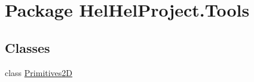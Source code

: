 \hypertarget{namespace_hel_hel_project_1_1_tools}{}\section{Package Hel\+Hel\+Project.\+Tools}
\label{namespace_hel_hel_project_1_1_tools}
\subsection*{Classes}
\begin{DoxyCompactItemize}
\item 
class \hyperlink{class_hel_hel_project_1_1_tools_1_1_primitives2_d}{Primitives2\+D}
\end{DoxyCompactItemize}
